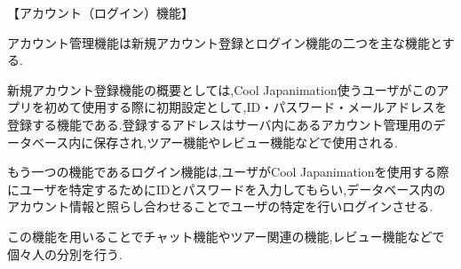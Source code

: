 【アカウント（ログイン）機能】
\par アカウント管理機能は新規アカウント登録とログイン機能の二つを主な機能とする.
\par 新規アカウント登録機能の概要としては,Cool Japanimation使うユーザがこのアプリを初めて使用する際に初期設定として,ID・パスワード・メールアドレスを登録する機能である.登録するアドレスはサーバ内にあるアカウント管理用のデータベース内に保存され,ツアー機能やレビュー機能などで使用される.
\par もう一つの機能であるログイン機能は,ユーザがCool Japanimationを使用する際にユーザを特定するためにIDとパスワードを入力してもらい,データベース内のアカウント情報と照らし合わせることでユーザの特定を行いログインさせる.
\par この機能を用いることでチャット機能やツアー関連の機能,レビュー機能などで個々人の分別を行う.
